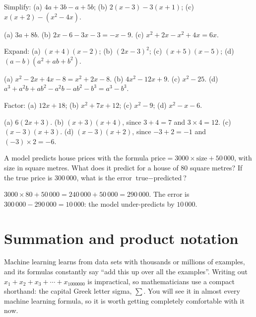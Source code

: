 \begin{exercise}
Simplify: (a) $4a + 3b - a + 5b$; (b) $2(x-3) - 3(x+1)$;
(c) $x(x + 2) - (x^2 - 4x)$.
\end{exercise}
\begin{solution}
(a) $3a + 8b$. (b) $2x - 6 - 3x - 3 = -x - 9$.
(c) $x^2 + 2x - x^2 + 4x = 6x$.
\end{solution}

\begin{exercise}
Expand: (a) $(x+4)(x-2)$; (b) $(2x - 3)^2$; (c) $(x+5)(x-5)$;
(d) $(a - b)(a^2 + ab + b^2)$.
\end{exercise}
\begin{solution}
(a) $x^2 - 2x + 4x - 8 = x^2 + 2x - 8$. (b) $4x^2 - 12x + 9$.
(c) $x^2 - 25$. (d) $a^3 + a^2b + ab^2 - a^2b - ab^2 - b^3 = a^3 - b^3$.
\end{solution}

\begin{exercise}
Factor: (a) $12x + 18$; (b) $x^2 + 7x + 12$; (c) $x^2 - 9$;
(d) $x^2 - x - 6$.
\end{exercise}
\begin{solution}
(a) $6(2x + 3)$. (b) $(x+3)(x+4)$, since $3+4=7$ and $3\times4=12$.
(c) $(x-3)(x+3)$. (d) $(x-3)(x+2)$, since $-3+2=-1$ and $(-3)\times2=-6$.
\end{solution}

\begin{exercise}
A model predicts house prices with the formula
$\text{price} = 3000 \times \text{size} + 50\,000$, with size in square
metres. What does it predict for a house of $80$ square metres? If the true
price is $300\,000$, what is the error $\text{true} - \text{predicted}$?
\end{exercise}
\begin{solution}
$3000 \times 80 + 50\,000 = 240\,000 + 50\,000 = 290\,000$. The error is
$300\,000 - 290\,000 = 10\,000$: the model under-predicts by $10\,000$.
\end{solution}

\section{Summation and product notation}\label{sec:summation}

\begin{motivation}
Machine learning learns from data sets with thousands or millions of
examples, and its formulas constantly say ``add this up over all the
examples''. Writing out $x_1 + x_2 + x_3 + \cdots + x_{1000000}$ is
impractical, so mathematicians use a compact shorthand: the capital Greek
letter sigma, $\sum$. You will see it in almost every machine learning formula,
so it is worth getting completely comfortable with it now.
\end{motivation}

